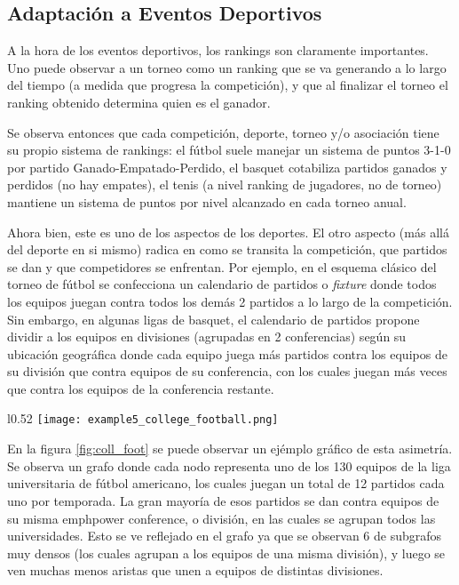 \subsection{Adaptaci\'on a Eventos Deportivos}
\par A la hora de los eventos deportivos, los rankings son claramente
importantes. Uno puede observar a un torneo como un ranking que se va generando
a lo largo del tiempo (a medida que progresa la competici\'on), y que al
finalizar el torneo el ranking obtenido determina quien es el ganador.

\par Se observa entonces que cada competici\'on, deporte, torneo y/o
asociaci\'on tiene su propio sistema de rankings: el f\'utbol suele manejar un
sistema de puntos 3-1-0 por partido Ganado-Empatado-Perdido, el basquet
cotabiliza partidos ganados y perdidos (no hay empates), el tenis (a nivel
ranking de jugadores, no de torneo) mantiene un sistema de puntos por nivel
alcanzado en cada torneo anual.

\par Ahora bien, este es uno de los aspectos de los deportes. El otro aspecto
(m\'as all\'a del deporte en si mismo) radica en como se transita la
competici\'on, que partidos se dan y que competidores se enfrentan. Por ejemplo,
en el esquema cl\'asico del torneo de f\'utbol se confecciona un calendario de
partidos o \emph{fixture} donde todos los equipos juegan contra todos los
dem\'as 2 partidos a lo largo de la competici\'on. Sin embargo, en algunas ligas
de basquet, el calendario de partidos propone dividir a los equipos en
divisiones (agrupadas en 2 conferencias) seg\'un su ubicaci\'on geogr\'afica
donde cada equipo juega m\'as partidos contra los equipos de su divisi\'on que
contra equipos de su conferencia, con los cuales juegan m\'as veces que contra
los equipos de la conferencia restante.

\begin{wrapfigure}[22]{l}{0.52\textwidth}
    \centering
    \texttt{[image: example5\_college\_football.png]}
    \caption{Grafo de Encuentros de la liga de f\'utbol americano universitaria}
    \label{fig:coll_foot}
\end{wrapfigure}

\par En la figura \ref{fig:coll_foot} se puede observar un ej\'emplo gr\'afico
de esta asimetr\'ia. Se observa un grafo donde cada nodo representa uno de los
130 equipos de la liga universitaria de f\'utbol americano, los cuales juegan un
total de 12 partidos cada uno por temporada. La gran mayor\'ia de esos partidos
se dan contra equipos de su misma emph{power conference}, o divisi\'on, en las
cuales se agrupan todos las universidades. Esto se ve reflejado en el grafo ya
que se observan 6 de subgrafos muy densos (los cuales agrupan a los equipos de
una misma divisi\'on), y luego se ven muchas menos aristas que unen a equipos de
distintas divisiones.

